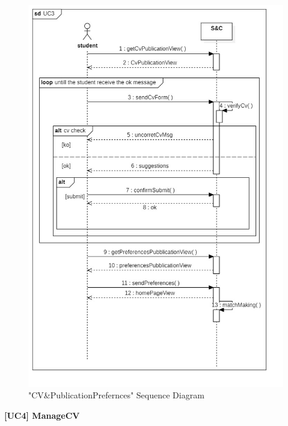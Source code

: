 \documentclass{article}
\begin{document}
\begin{figure}[H]
    \centering
    \includegraphics[width=1\linewidth]{sequenceDiagrams/UC3.jpg}
    \caption{"CV\&PublicationPrefernces" Sequence Diagram}
\end{figure}
\textbf{[UC4] ManageCV}
\end{document}
